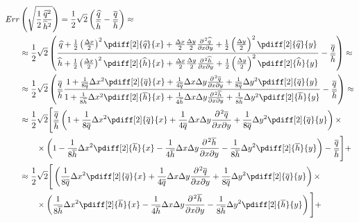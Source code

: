 \begin{align}
    {\mathit Err}& \left( \sqrt{\half \frac{\widehat{q}^2}{\widehat{h}^2}} \right) =
    \half \sqrt{2} \left( \frac{\widehat{q}}{\widehat{h}}
    - \frac{\overline{q}}{\overline{h}} \right)
    \approx
    \\*
    & \approx
    \half\sqrt{2} \left(
    \frac{\qhat + \half\left(\frac{\Dx}{2}\right)^2\pdiff[2]{\qhat}{x}
        +  \frac{\Dx}{2} \frac{\Dy}{2} \frac{\partial\kern 0.083333em ^2 \qhat}{\partial x \partial y}
        + \half\left(\frac{\Dy}{2}\right)^2\pdiff[2]{\qhat}{y}}
    {\hhat + \half\left(\frac{\Dx}{2}\right)^2\pdiff[2]{\hhat}{x}
        +  \frac{\Dx}{2} \frac{\Dy}{2}
        \frac{\partial\kern 0.083333em ^2 \hhat}{\partial x \partial y}
        + \half\left(\frac{\Dy}{2}\right)^2\pdiff[2]{\hhat}{y}}
    - \frac{\qbar}{\hbar} \right) \approx
    \\*
    &
    \approx
    \half\sqrt{2} \left(
    \frac{\qbar}{\hbar}
    \frac{1 + \frac{1}{8\qbar}\Dx^2\pdiff[2]{\qbar}{x}
        +  \frac{1}{4\qbar} \Dx\Dy
        \frac{\partial\kern 0.083333em ^2 \qbar}{\partial x \partial y}
        + \frac{1}{8\qbar}\Dy^2\pdiff[2]{\qbar}{y}}
    {1 + \frac{1}{8\hbar}\Dx^2\pdiff[2]{\hbar}{x}
        +  \frac{1}{4\hbar}\Dx\Dy
        \frac{\partial\kern 0.083333em ^2 \hbar}{\partial x \partial y}
        + \frac{1}{8\hbar}\Dy^2\pdiff[2]{\hbar}{y}}
    - \frac{\qbar}{\hbar} \right) \approx
    \\*
    &
    \approx \half\sqrt{2} \Bigg[ \frac{\qbar}{\hbar}
    \left(1 + \frac{1}{8\qbar}\Dx^2\pdiff[2]{\qbar}{x}
    +  \frac{1}{4\qbar} \Dx\Dy
    \frac{\partial\kern 0.083333em ^2 \qbar}{\partial x \partial y}
    + \frac{1}{8\qbar}\Dy^2\pdiff[2]{\qbar}{y}\right) \times
    \\*
    & \qquad \times
    \left(1 - \frac{1}{8\hbar}\Dx^2\pdiff[2]{\hbar}{x}
    -  \frac{1}{4\hbar}\Dx\Dy
    \frac{\partial\kern 0.083333em ^2 \hbar}{\partial x \partial y}
    - \frac{1}{8\hbar}\Dy^2\pdiff[2]{\hbar}{y} \right)
    - \frac{\qbar}{\hbar} \Bigg]+
    \\*
    &\approx \half\sqrt{2} \Bigg[
    \left(\frac{1}{8\qbar}\Dx^2\pdiff[2]{\qbar}{x}
    +  \frac{1}{4\qbar} \Dx\Dy
    \frac{\partial\kern 0.083333em ^2 \qbar}{\partial x \partial y}
    + \frac{1}{8\qbar}\Dy^2\pdiff[2]{\qbar}{y}\right) \times
    \\*
    & \qquad \times
    \left( \frac{1}{8\hbar}\Dx^2\pdiff[2]{\hbar}{x}
    -  \frac{1}{4\hbar}\Dx\Dy
    \frac{\partial\kern 0.083333em ^2 \hbar}{\partial x \partial y}
    - \frac{1}{8\hbar}\Dy^2\pdiff[2]{\hbar}{y} \right) \Bigg]+
\end{align}
